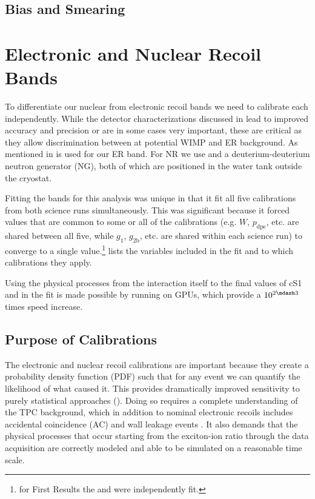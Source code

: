 \subsection{Bias and Smearing}
\label{subsec:det_char_bias_smearing}



\section{Electronic and Nuclear Recoil Bands}
\label{sec:er_nr_calibrations}
To differentiate our nuclear from electronic recoil bands we need to calibrate each independently.  While the detector characterizations
discussed in  lead to improved accuracy and precision or are in some cases very important, these are critical as
they allow discrimination between at potential WIMP and ER background.  As mentioned in
  is used for our ER band.  For NR we use  and a deuterium-deuterium
neutron generator (NG), both of which are positioned in the water tank outside the cryostat.

Fitting the bands for this analysis was unique in that it fit all five calibrations from both science runs simultaneously.  This was
significant because it forced values that are common to some or all of the calibrations (e.g. $W$, $p_{\mathrm{dpe}}$, etc. are shared
between all five, while $g_1$, $g_{2\mathrm{b}}$, etc. are shared within each science run) to converge to a single value.\footnote{for First Results
the \radoncal and \ambe were independently fit.}   lists the variables included in the fit and
to which calibrations they apply.



Using the physical processes from the interaction itself to the final values of cS1 and \cstwob in the fit is made
possible by running on GPUs, which provide a $10^{2 \mdash 3}$ times speed increase.



\subsection{Purpose of Calibrations}
\label{subsec:er_nr_calibrations_purpose}
The electronic and nuclear recoil calibrations are important because they create a probability density function (PDF)
such that for any event we can quantify the likelihood of what caused it.  This provides dramatically improved sensitivity
to purely statistical approaches ().  Doing so requires a complete understanding of the TPC background, which
in addition to nominal electronic recoils includes accidental coincidence (AC) and wall leakage events
.  It also demands that
the physical processes that occur starting from the exciton-ion ratio through the data acquisition are correctly modeled and able to be
simulated on a reasonable time scale.


